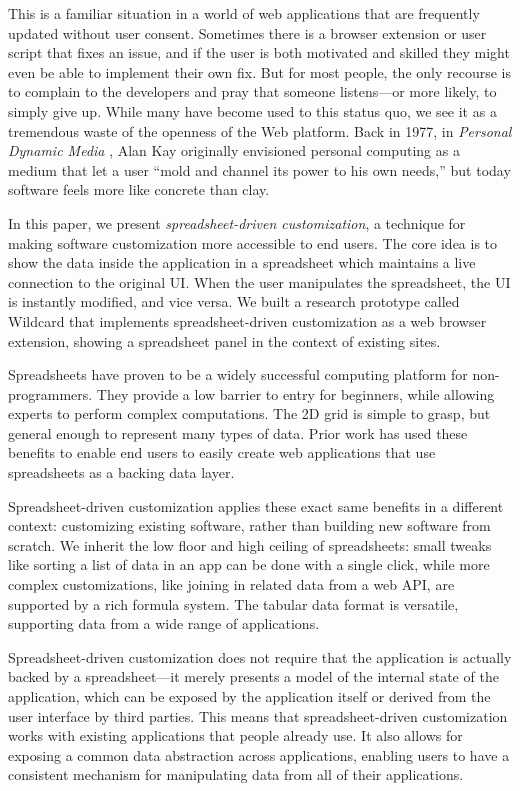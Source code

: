 \documentclass[english,submission]{programming}
\begin{document}
This is a familiar situation in a world of web applications that are
frequently updated without user consent. Sometimes there is a browser
extension or user script that fixes an issue, and if the user is both
motivated and skilled they might even be able to implement their own
fix. But for most people, the only recourse is to complain to the
developers and pray that someone listens---or more likely, to simply
give up. While many have become used to this status quo, we see it as a
tremendous waste of the openness of the Web platform. Back in 1977, in
\emph{Personal Dynamic Media} \autocite{kay1977}, Alan Kay originally
envisioned personal computing as a medium that let a user ``mold and
channel its power to his own needs,'' but today software feels more like
concrete than clay.

In this paper, we present \emph{spreadsheet-driven customization}, a
technique for making software customization more accessible to end
users. The core idea is to show the data inside the application in a
spreadsheet which maintains a live connection to the original UI. When
the user manipulates the spreadsheet, the UI is instantly modified, and
vice versa. We built a research prototype called Wildcard that
implements spreadsheet-driven customization as a web browser extension,
showing a spreadsheet panel in the context of existing sites.

Spreadsheets have proven to be a widely successful computing platform
for non-programmers. They provide a low barrier to entry for beginners,
while allowing experts to perform complex computations. The 2D grid is
simple to grasp, but general enough to represent many types of data.
Prior work \autocite{mccutchen2016,benson2014,chang2014} has used these
benefits to enable end users to easily create web applications that use
spreadsheets as a backing data layer.

Spreadsheet-driven customization applies these exact same benefits in a
different context: customizing existing software, rather than building
new software from scratch. We inherit the low floor and high ceiling of
spreadsheets: small tweaks like sorting a list of data in an app can be
done with a single click, while more complex customizations, like
joining in related data from a web API, are supported by a rich formula
system. The tabular data format is versatile, supporting data from a
wide range of applications.

Spreadsheet-driven customization does not require that the application
is actually backed by a spreadsheet---it merely presents a model of the
internal state of the application, which can be exposed by the
application itself or derived from the user interface by third parties.
This means that spreadsheet-driven customization works with existing
applications that people already use. It also allows for exposing a
common data abstraction across applications, enabling users to have a
consistent mechanism for manipulating data from all of their
applications.
\end{document}
